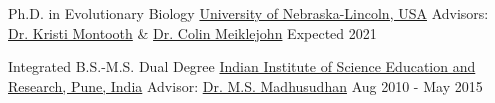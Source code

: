 

\begin{cventries}

  \eduentry
    {Ph.D. in Evolutionary Biology}  %
    {\href{https://biosci.unl.edu/}{University of Nebraska-Lincoln, USA}}  %
    {Advisors: \href{http://montoothlab.unl.edu/}{Dr. Kristi Montooth} \& \href{http://meiklejohnlab.unl.edu/}{Dr. Colin Meiklejohn}}  %
    {Expected 2021}  %

  \vspace{2.0mm} %

  \eduentry
    {Integrated B.S.-M.S. Dual Degree} %
    {\href{https://www.iiserpune.ac.in/}{Indian Institute of Science Education and Research, Pune, India}} %
    {Advisor: \href{http://cospi.iiserpune.ac.in/cospi/}{Dr. M.S. Madhusudhan}} %
    {Aug 2010 - May 2015} %

\end{cventries}
